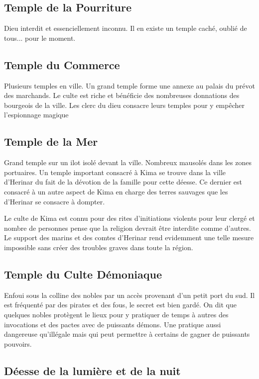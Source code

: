 \subsection{Temple de la Pourriture}

Dieu interdit et essenciellement inconnu. Il en existe un temple caché, oublié de tous... pour le moment.

\subsection{Temple du Commerce}

Plusieurs temples en ville. Un grand temple forme une annexe au palais 
du prévot des marchands. Le culte est riche et bénéficie des nombreuses
donnations des bourgeois de la ville. Les clerc du dieu consacre leurs
temples pour y empêcher l'espionnage magique 

\subsection{Temple de la Mer}

Grand temple sur un ilot isolé devant la ville. Nombreux mausolés dans les 
zones portuaires. Un temple important consacré à Kima se trouve dans la 
ville d'Herinar du fait de la dévotion de la famille pour cette déesse. 
Ce dernier est consacré à un autre aspect de Kima en charge des terres
sauvages que les d'Herinar se consacre à dompter.

Le culte de Kima est connu pour des rites d'initiations violents pour
leur clergé et nombre de personnes pense que la religion devrait être
interdite comme d'autres. Le support des marins et des comtes d'Herinar 
rend evidemment une telle mesure impossible sans créer des troubles
graves dans toute la région.

\subsection{Temple du Culte Démoniaque}

Enfoui sous la colline des nobles par un accès provenant d'un petit port du 
sud. Il est fréquenté par des pirates et des fous, le secret est bien gardé. 
On dit que quelques nobles protègent le lieux pour y pratiquer de temps à
autres des invocations et des pactes avec de puissants démons. Une pratique
aussi dangereuse qu'illégale mais qui peut permettre à certains de gagner
de puissants pouvoirs.

\subsection{Déesse de la lumière et de la nuit}


